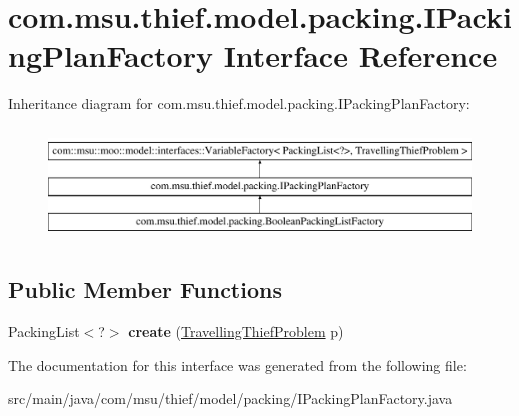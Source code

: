 \hypertarget{interfacecom_1_1msu_1_1thief_1_1model_1_1packing_1_1IPackingPlanFactory}{\section{com.\-msu.\-thief.\-model.\-packing.\-I\-Packing\-Plan\-Factory Interface Reference}
\label{interfacecom_1_1msu_1_1thief_1_1model_1_1packing_1_1IPackingPlanFactory}
}
Inheritance diagram for com.\-msu.\-thief.\-model.\-packing.\-I\-Packing\-Plan\-Factory\-:\begin{figure}[H]
\begin{center}
\leavevmode
\includegraphics[height=3.000000cm]{interfacecom_1_1msu_1_1thief_1_1model_1_1packing_1_1IPackingPlanFactory}
\end{center}
\end{figure}
\subsection*{Public Member Functions}
\begin{DoxyCompactItemize}
\item 
\hypertarget{interfacecom_1_1msu_1_1thief_1_1model_1_1packing_1_1IPackingPlanFactory_af7feddd76ad5f7ab49b365720fad712c}{Packing\-List$<$?$>$ {\bfseries create} (\hyperlink{classcom_1_1msu_1_1thief_1_1problems_1_1TravellingThiefProblem}{Travelling\-Thief\-Problem} p)}\label{interfacecom_1_1msu_1_1thief_1_1model_1_1packing_1_1IPackingPlanFactory_af7feddd76ad5f7ab49b365720fad712c}

\end{DoxyCompactItemize}


The documentation for this interface was generated from the following file\-:\begin{DoxyCompactItemize}
\item 
src/main/java/com/msu/thief/model/packing/I\-Packing\-Plan\-Factory.\-java\end{DoxyCompactItemize}
